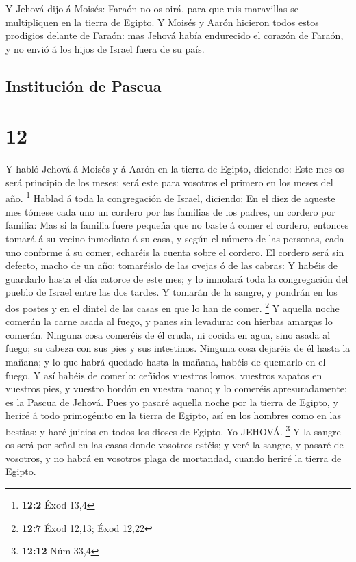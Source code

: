  Y Jehová dijo á Moisés: Faraón no os oirá, para que mis
maravillas se multipliquen en la tierra de Egipto.  Y
Moisés y Aarón hicieron todos estos prodigios delante de Faraón: mas
Jehová había endurecido el corazón de Faraón, y no envió á los hijos de
Israel fuera de su país.

\hypertarget{instituciuxf3n-de-pascua}{%
\subsection{Institución de Pascua}\label{instituciuxf3n-de-pascua}}

\hypertarget{section-11}{%
\section{12}\label{section-11}}

 Y habló Jehová á Moisés y á Aarón en la tierra de Egipto,
diciendo:  Este mes os será principio de los meses; será
este para vosotros el primero en los meses del año. \footnote{\textbf{12:2}
  Éxod 13,4}  Hablad á toda la congregación de Israel,
diciendo: En el diez de aqueste mes tómese cada uno un cordero por las
familias de los padres, un cordero por familia:  Mas si la
familia fuere pequeña que no baste á comer el cordero, entonces tomará á
su vecino inmediato á su casa, y según el número de las personas, cada
uno conforme á su comer, echaréis la cuenta sobre el cordero.
 El cordero será sin defecto, macho de un año: tomaréislo de
las ovejas ó de las cabras:  Y habéis de guardarlo hasta el
día catorce de este mes; y lo inmolará toda la congregación del pueblo
de Israel entre las dos tardes.  Y tomarán de la sangre, y
pondrán en los dos postes y en el dintel de las casas en que lo han de
comer. \footnote{\textbf{12:7} Éxod 12,13; Éxod 12,22}  Y
aquella noche comerán la carne asada al fuego, y panes sin levadura: con
hierbas amargas lo comerán.  Ninguna cosa comeréis de él
cruda, ni cocida en agua, sino asada al fuego; su cabeza con sus pies y
sus intestinos.  Ninguna cosa dejaréis de él hasta la
mañana; y lo que habrá quedado hasta la mañana, habéis de quemarlo en el
fuego.  Y así habéis de comerlo: ceñidos vuestros lomos,
vuestros zapatos en vuestros pies, y vuestro bordón en vuestra mano; y
lo comeréis apresuradamente: es la Pascua de Jehová.  Pues
yo pasaré aquella noche por la tierra de Egipto, y heriré á todo
primogénito en la tierra de Egipto, así en los hombres como en las
bestias: y haré juicios en todos los dioses de Egipto. Yo JEHOVÁ.
\footnote{\textbf{12:12} Núm 33,4}  Y la sangre os será por
señal en las casas donde vosotros estéis; y veré la sangre, y pasaré de
vosotros, y no habrá en vosotros plaga de mortandad, cuando heriré la
tierra de Egipto.

